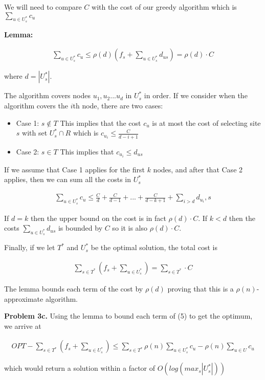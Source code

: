 \documentclass{article}
\begin{document}
We will need to compare $C$ with the cost of our greedy algorithm which is $\sum_{u \in U_s^*}c_u$

\hfill

\textbf{Lemma:}

\begin{gather}
    \sum_{u \in U_s^*}c_u \leq \rho(d)(f_s + \sum_{u \in U_s^*}d_{us}) = \rho(d) \cdot C
\end{gather}

where $d = |U_s^*|$.

\hfill
The algorithm covers nodes $u_1, u_2...u_d$ in $U_s^*$ in order. If we consider when the algorithm covers the $i$th node, there are two cases:

\begin{itemize}
    \item Case 1: $s \notin T$
        \subitem This implies that the cost $c_u$ is at most the cost of selecting site $s$ with set $U_s^* \cap R$ which is $c_{u_i} \leq \frac{C}{d-i+1}$
    \item Case 2: $s \in T$
        \subitem This implies that $c_{u_i} \leq d_{us}$
\end{itemize}

\hfill

If we assume that Case 1 applies for the first $k$ nodes, and after that Case 2 applies, then we can sum all the costs in $U_s^*$

\begin{gather}
    \sum_{u \in U_s^*} c_u \leq \frac{C}{d} + \frac{C}{d-1} + ... + \frac{C}{d-k+1} + \sum_{i > d}d_{u_i}, s
\end{gather}

If $d=k$ then the upper bound on the cost is in fact $\rho(d) \cdot C$. If $k < d$ then the costs $\sum_{u \in U_s^*}d_{us}$ is bounded by $C$ so it is also $\rho(d) \cdot C$.

Finally, if we let $T^*$ and $U_s^*$ be the optimal solution, the total cost is

\begin{gather}
    \sum_{s \in T^*} (f_s + \sum_{u \in U_s^*}) = \sum_{s \in T^*} \cdot C
\end{gather}

The lemma bounds each term of the cost by $\rho(d)$ proving that this is a $\rho(n)$-approximate algorithm.

\hfill

\textbf{Problem 3c.} Using the lemma to bound each term of (5) to get the optimum, we arrive at 

\begin{gather}
    OPT -  \sum_{s \in T^*} (f_s + \sum_{u \in U_s^*}) \leq \sum_{s \in T^*} \rho(n) \sum_{u \in U_s^*} c_u - \rho(n) \sum_{u \in U} c_u
\end{gather}

which would return a solution within a factor of $O(log(max_s |U_s^*|))$

\newpage
 

\end{document}
